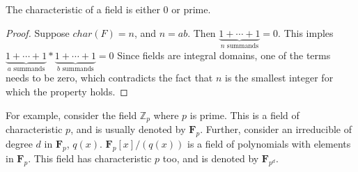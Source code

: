 \begin{lemma} \label{lem:charprime}
  The characteristic of a field is either $0$ or prime.
\end{lemma}
\begin{proof} \label{proof:charprime}
  Suppose $char(F) = n$, and $n = ab$.
  Then $\underbrace{1+\cdots+1}_{n \text{ summands}} = 0$.
  This imples $\underbrace{1+\cdots+1}_{a \text{ summands}} * \underbrace{1+\cdots+1}_{b \text{ summands}} = 0$
  Since fields are integral domains, one of the terms needs to be zero, which contradicts the fact that $n$ is the smallest integer for which the property holds.
\end{proof}
For example, consider the field $\mathbb{Z}_{p}$ where $p$ is prime.
This is a field of characteristic $p$, and is usually denoted by $\mathbf{F}_{p}$.
Further, consider an irreducible of degree $d$ in $\mathbf{F}_{p}$, $q(x)$.
$\mathbf{F}_{p}[x] \big/ (q(x))$ is a field of polynomials with elements in $\mathbf{F}_{p}$.
This field has characteristic $p$ too, and is denoted by $\mathbf{F}_{p^{d}}$.
